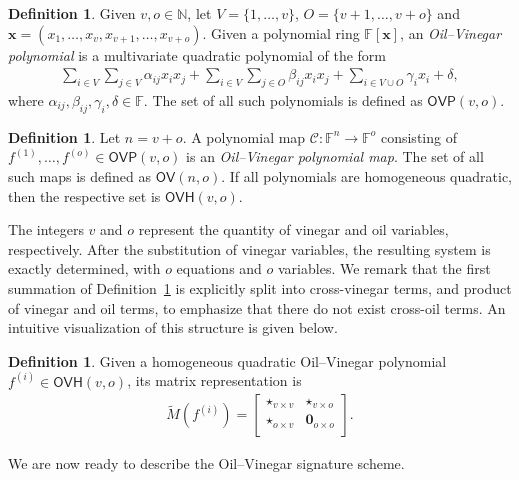 \documentclass[12pt, a4paper, oneside]{memoir}
\theoremstyle{definition}
\newtheorem{definition}[theorem]{Definition}
\begin{document}
\begin{definition}\label{def:oil-vinegar-poly}
  Given $v, o \in \mathbb{N}$, let $V = \{1, \dots, v\}$, $O = \{v + 1, \dots, v + o\}$ and $\mathbf{x} = (x_{1}, \dots, x_{v}, x_{v + 1}, \dots, x_{v + o})$. Given a polynomial ring $\mathbb{F}[\mathbf{x}]$, an \emph{Oil--Vinegar polynomial} is a multivariate quadratic polynomial of the form
  \begin{align}
    \sum_{i \in V} \sum_{j \in V} \alpha_{ij} x_{i} x_{j}
      + \sum_{i \in V} \sum_{j \in O} \beta_{ij} x_{i} x_{j}
      + \sum_{i \in V \cup O} \gamma_{i} x_{i}
      + \delta,
  \end{align}
  where $\alpha_{ij}, \beta_{ij}, \gamma_{i}, \delta \in \mathbb{F}$. The set of all such polynomials is defined as $\mathsf{OVP}(v, o)$.
\end{definition}

\begin{definition}
  Let $n = v + o$. A polynomial map $\mathcal{C} : \mathbb{F}^{n} \to \mathbb{F}^{o}$ consisting of $f^{(1)}, \dots, f^{(o)} \in \mathsf{OVP}(v, o)$ is an \emph{Oil--Vinegar polynomial map}. The set of all such maps is defined as $\mathsf{OV}(n, o)$. If all polynomials are homogeneous quadratic, then the respective set is $\mathsf{OVH}(v, o)$.
\end{definition}

The integers $v$ and $o$ represent the quantity of vinegar and oil variables, respectively. After the substitution of vinegar variables, the resulting system is exactly determined, with $o$ equations and $o$ variables. We remark that the first summation of Definition~\ref{def:oil-vinegar-poly} is explicitly split into cross-vinegar terms, and product of vinegar and oil terms, to emphasize that there do not exist cross-oil terms. An intuitive visualization of this structure is given below.

\begin{definition}
  Given a homogeneous quadratic Oil--Vinegar polynomial $f^{(i)} \in \mathsf{OVH}(v, o)$, its matrix representation is
  \begin{align}
    \widetilde{M}(f^{(i)}) =
    \begin{bmatrix}
      \star_{v \times v} & \star_{v \times o} \\
      \star_{o \times v} & \mathbf{0}_{o \times o} \\
    \end{bmatrix}.
  \end{align}
\end{definition}
We are now ready to describe the Oil--Vinegar signature scheme.
\end{document}
